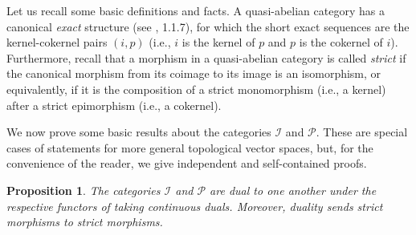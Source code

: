 \documentclass[12pt,reqno]{amsart}
\newtheorem{prop}[thm]{Proposition}
\theoremstyle{definition}
\theoremstyle{remark}
\begin{document}
	Let us recall some basic definitions and facts. A quasi-abelian category has a canonical \emph{exact} structure (see \cite{Schneiders}, 1.1.7), for which the short exact sequences are the kernel-cokernel pairs $(i,p)$ (i.e., $i$ is the kernel of $p$ and $p$ is the cokernel of $i$). 
	Furthermore, recall that a morphism in a quasi-abelian category is called \emph{strict} if the canonical morphism from its coimage to its image is an isomorphism, or equivalently, if it is the composition of a strict monomorphism (i.e., a kernel) after a strict epimorphism (i.e., a cokernel).
	
	We now prove some basic results about the categories $\mathcal{I}$ and $\mathcal{P}$. These are special cases of statements for more general topological vector spaces, but, for the convenience of the reader, we give independent and self-contained proofs.
	\begin{prop}\label{prop:duals}
	    The categories $\mathcal{I}$ and $\mathcal{P}$  are dual to one another under the respective functors of taking continuous duals. Moreover, duality sends strict morphisms to strict morphisms.
	\end{prop}
\end{document}
